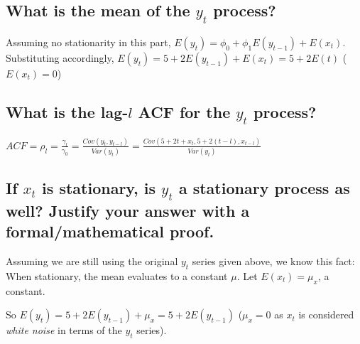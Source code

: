 \documentclass{article}
\begin{document}
\subsection{What is the mean of the $y_{t}$ process?}

\par\noindent\Large Assuming no stationarity in this part, $E(y_{t}) = \phi_{0} + \phi_{1}E(y_{t - 1}) + E(x_{t})$.  Substituting accordingly, $E(y_{t}) = 5 + 2E(y_{t - 1}) + E(x_{t}) = 5 + 2E(t)$ ($E(x_{t}) = 0$)\vspace{0.25cm}



\subsection{What is the lag-$l$ ACF for the $y_{t}$ process?}

\par\noindent\Large $ACF = \rho_{l} = \frac{\gamma_l}{\gamma_0} = \frac{Cov(y_{t}, y_{t - l})}{Var(y_{t})} = \frac{Cov(5 + 2t + x_{t}, 5 + 2(t - l), x_{t - l})}{Var(y_{t})}$



\subsection{If $x_{t}$ is stationary, is $y_{t}$ a stationary process as well?  Justify your answer with a formal/mathematical proof.}
\par\noindent\Large Assuming we are still using the original $y_{t}$ series given above, we know this fact: When stationary, the mean evaluates to a constant $\mu$.  Let $E(x_{t}) = \mu_{x}$, a constant.\vspace{0.25cm}

\par\noindent\Large So $E(y_{t}) = 5 + 2E(y_{t - 1}) + \mu_{x} = 5 + 2E(y_{t - 1})$ ($\mu_{x} = 0$ as $x_{t}$ is considered \textit{white noise} in terms of the $y_{t}$ series).\vspace{0.25cm}
\end{document}
